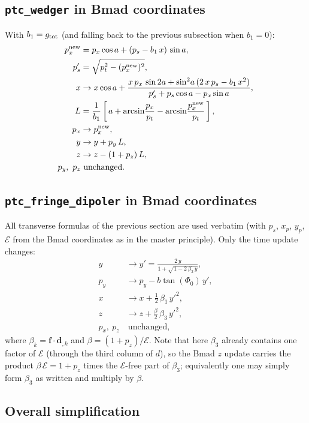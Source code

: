 \documentclass[11pt]{article}
\newcommand{\code}[1]{\texttt{#1}}
\newcommand{\ptcE}{\mathcal{E}}          %
\begin{document}
\subsection{\code{ptc\_wedger} in Bmad coordinates}
With $b_1 = g_{\rm tot}$ (and falling back to the previous subsection when
$b_1=0$):
\begin{align}
  p_x^{\rm new} &= p_x\cos a + (p_s - b_1\,x)\,\sin a, \\
  p_s'          &= \sqrt{p_t^2 - (p_x^{\rm new})^2}, \\
  x             &\to x\cos a
     + \frac{x\,p_x\,\sin 2a + \sin^2\!a\,(2\,x\,p_s - b_1\,x^2)}
            {p_s' + p_s\cos a - p_x\sin a}, \\
  L             &= \frac{1}{b_1}\left[\,a + \arcsin\!\frac{p_x}{p_t}
                            - \arcsin\!\frac{p_x^{\rm new}}{p_t}\,\right], \\
  p_x           &\to p_x^{\rm new}, \\
  y             &\to y + p_y\,L, \\
  z             &\to z - (1 + p_z)\,L, \\
  p_y,\ p_z     &\ \text{unchanged.}
\end{align}

\subsection{\code{ptc\_fringe\_dipoler} in Bmad coordinates}
All transverse formulas of the previous section are used verbatim (with $p_s$,
$x_p$, $y_p$, $\ptcE$ from the Bmad coordinates as in the master principle). Only
the time update changes:
\begin{align}
  y   &\to y' = \frac{2\,y}{1 + \sqrt{1 - 2\,\beta_2\,y}}, \\
  p_y &\to p_y - b\tan(\Phi_0)\,y', \\
  x   &\to x + \tfrac12\,\beta_1\,y'^2, \\
  z   &\to z + \tfrac{\beta}{2}\,\beta_3\,y'^2, \\
  p_x,\ p_z &\ \text{unchanged,}
\end{align}
where $\beta_k = \mathbf f\cdot\mathbf d_{,k}$ and $\beta = (1+p_z)/\ptcE$. Note
that here $\beta_3$ already contains one factor of $\ptcE$ (through the third
column of $d$), so the Bmad $z$ update carries the product $\beta\,\ptcE = 1+p_z$
times the $\ptcE$-free part of $\beta_3$; equivalently one may simply form
$\beta_3$ as written and multiply by $\beta$.

\subsection{Overall simplification}
\end{document}
